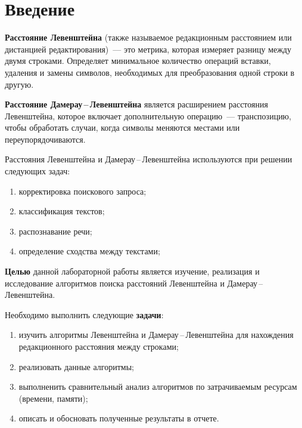 \chapter*{Введение}

\textbf{Расстояние Левенштейна} (также называемое редакционным рас\-стоянием
или дистанцией редактирования)~--- это метрика, которая измеря\-ет разницу
между двумя строками. Определяет минимальное количество опе\-раций 
вставки, удаления и замены символов, необходимых для преобра\-зования
одной строки в другую.

\textbf{Расстояние Дамерау\,--\,Левенштейна} является расширением рас\-стояния 
Левенштейна, которое включает дополнительную операцию~--- транспозицию,
чтобы обработать случаи, когда символы меняются местами или
переу\-порядочиваются.

Расстояния Левенштейна и Дамерау\,--\,Левенштейна используются
при решении следующих задач:
\begin{enumerate}
    \item корректировка поискового запроса;
    \item классификация текстов;
    \item распознавание речи;
    \item определение сходства между текстами;
\end{enumerate}

\textbf{Целью} данной лабораторной работы является изучение, 
реализация и исследование алгоритмов поиска расстояний Левенштейна 
и Дамерау\,--\,Левенштейна.

Необходимо выполнить следующие \textbf{задачи}:
\begin{enumerate}[]
    \item изучить алгоритмы Левенштейна и Дамерау\,--\,Левенштейна для нахождения редакционного расстояния между строками;
    \item реализовать данные алгоритмы;
    \item выполненить сравнительный анализ алгоритмов по затрачиваемым ресурсам (времени, памяти);
    \item описать и обосновать полученные результаты в отчете.
\end{enumerate}